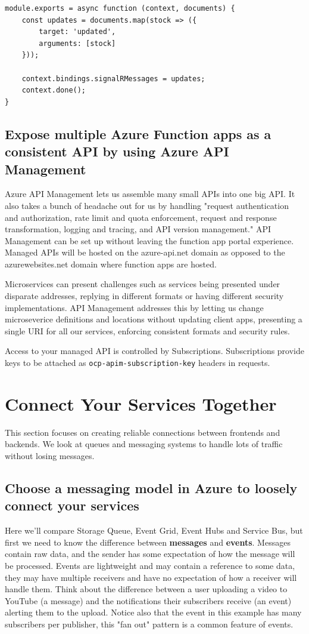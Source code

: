 \documentclass{article}
\newcommand{\code}{\texttt}
\begin{document}
\begin{lstlisting}
module.exports = async function (context, documents) {
    const updates = documents.map(stock => ({
        target: 'updated',
        arguments: [stock]
    }));

    context.bindings.signalRMessages = updates;
    context.done();
}
\end{lstlisting}

\subsection{Expose multiple Azure Function apps as a consistent API by using Azure API Management}
Azure API Management lets us assemble many small APIs into one big API. It also takes a bunch of headache out for us by handling "request authentication and authorization, rate limit and quota enforcement, request and response transformation, logging and tracing, and API version management." API Management can be set up without leaving the function app portal experience. Managed APIs will be hosted on the azure-api.net domain as opposed to the azurewebsites.net domain where function apps are hosted.

Microservices can present challenges such as services being presented under disparate addresses, replying in different formats or having different security implementations. API Management addresses this by letting us change microseverice definitions and locations without updating client apps, presenting a single URI for all our services, enforcing consistent formats and security rules.

Access to your managed API is controlled by Subscriptions. Subscriptions provide keys to be attached as \code{ocp-apim-subscription-key} headers in requests.

\section{Connect Your Services Together}
This section focuses on creating reliable connections between frontends and backends. We look at queues and messaging systems to handle lots of traffic without losing messages. 

\subsection{Choose a messaging model in Azure to loosely connect your services }
Here we'll compare Storage Queue, Event Grid, Event Hubs and Service Bus, but first we need to know the difference between \textbf{messages} and \textbf{events}. Messages contain raw data, and the sender has some expectation of how the message will be processed. Events are lightweight and may contain a reference to some data, they may have multiple receivers and have no expectation of how a receiver will handle them. Think about the difference between a user uploading a video to YouTube (a message) and the notifications their subscribers receive (an event) alerting them to the upload. Notice also that the event in this example has many subscribers per publisher, this "fan out" pattern is a common feature of events.
\end{document}
